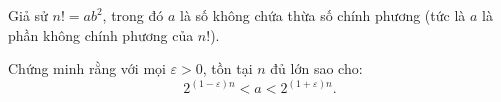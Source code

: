 \ifshowproblem
\begin{problem}\label{example:RUS-2015-TMO-S-P4}
    Giả sử \( n! = ab^2 \), trong đó \( a \) là số không chứa thừa số chính phương (tức là \( a \) là phần không chính phương của \( n! \)).

    Chứng minh rằng với mọi \( \varepsilon > 0 \), tồn tại \( n \) đủ lớn sao cho:
    \[
        2^{(1 - \varepsilon)n} < a < 2^{(1 + \varepsilon)n}.
    \]\end{problem}
\fi

\footnotemark
{}
\fi